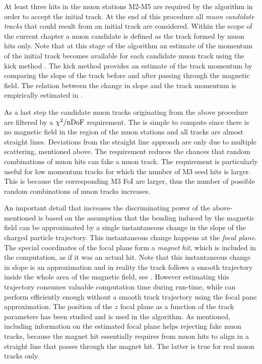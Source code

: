 At least three hits in the muon stations M2-M5 are required by the \mvm algorithm in order to accept the initial \velo track.
At the end of this procedure all {\it muon candidate tracks} that could result from an initial \velo track are considered.
Within the scope of the current chapter a muon candidate is defined as the track formed by muon hits only.
Note that at this stage of the algorithm an estimate of the momentum of the initial \velo track becomes available
for each candidate muon track using the kick method \cite{Hommels:999327}. The kick method provides an estimate
of the track momentum by comparing the slope of the track before and after passing through the \lhcb magnetic
field. The relation between the change in slope and the track momentum is empirically estimated in \cite{roelThesis}.

As a last step the candidate muon tracks originating from the above procedure are filtered by a $\chi^2/\rm nDoF$
requirement. The \chisq is simple to compute since there is no magnetic field in the region of the muon stations
and all tracks are almost straight lines. Deviations from the straight line approach are only due to
multiple scattering, mentioned above. The \chisq requirement reduces the chances that random combinations of muon hits
can fake a muon track. The requirement is particularly useful for low momentum tracks for which the number
of M3 seed hits is larger. This is because the corresponding M3 FoI are larger, thus the number of possible
random combinations of muon tracks increases.

An important detail that increases the discriminating power of the above-mentioned \chisq is based on the
assumption that the bending induced by the \lhcb magnetic field can be approximated by a single instantaneous
change in the slope of the charged particle trajectory. This instantaneous change happens at the {\it focal plane}.
The special coordinates of the focal plane form a {\it magnet hit}, which is included in
the \chisq computation, as if it was an actual hit. Note that this instantaneous change in slope is an approximation
and in reality the track follows a smooth trajectory inside the whole area of the magnetic field, see .
However estimating this trajectory consumes valuable computation time during \hltone run-time, while \mvm can perform
efficiently enough without a smooth track trajectory using the focal
pane approximation. The position of the $z$ focal plane as a function of the track parameters has been studied
\cite{Hommels:999327} and is used in the \mvm algorithm. As mentioned, including information on the estimated
focal plane helps rejecting fake muon tracks, because the magnet hit essentially requires from muon hits to align in a straight line that passes through the magnet hit. The latter is true for real muon tracks only.

